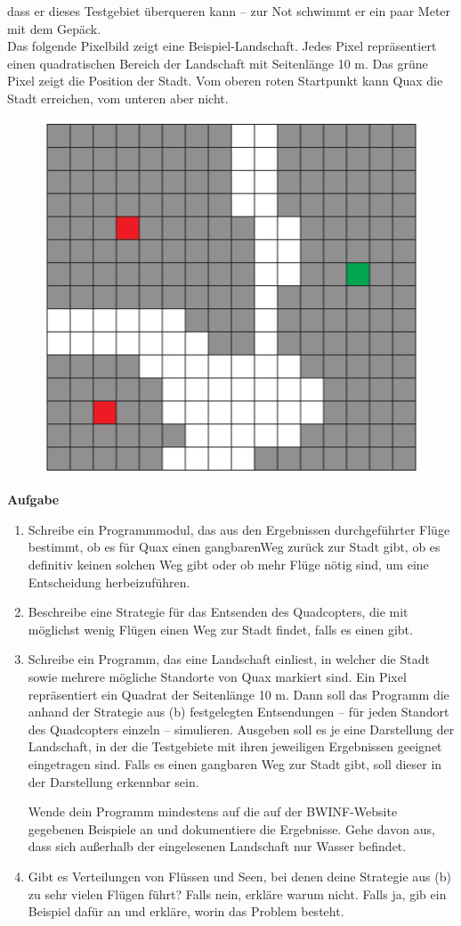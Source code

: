 \documentclass[a4paper,12pt]{article}
\begin{document}
dass er dieses Testgebiet überqueren kann – zur Not schwimmt er ein paar Meter mit dem Gepäck.
\\[0.4cm]
Das folgende Pixelbild zeigt eine Beispiel-Landschaft. Jedes Pixel repräsentiert einen quadratischen
Bereich der Landschaft mit Seitenlänge 10 m. Das grüne Pixel zeigt die Position der
Stadt. Vom oberen roten Startpunkt kann Quax die Stadt erreichen, vom unteren aber nicht.
\begin{figure}[H]
\centering
    \includegraphics[width=0.4\linewidth]{Bilder/Aufgabe3/Aufgabenstellung_01.png}
\end{figure}
\begin{large}
    \textbf{Aufgabe} \\
\end{large}
\vspace{-0.6cm}
\begin{enumerate}[label=(\emph{\alph*})]
\item Schreibe ein Programmmodul, das aus den Ergebnissen durchgeführter Flüge bestimmt,
ob es für Quax einen gangbarenWeg zurück zur Stadt gibt, ob es definitiv keinen solchen
Weg gibt oder ob mehr Flüge nötig sind, um eine Entscheidung herbeizuführen.
\item Beschreibe eine Strategie für das Entsenden des Quadcopters, die mit möglichst wenig
Flügen einen Weg zur Stadt findet, falls es einen gibt.
\item Schreibe ein Programm, das eine Landschaft einliest, in welcher die Stadt sowie mehrere
mögliche Standorte von Quax markiert sind. Ein Pixel repräsentiert ein Quadrat der
Seitenlänge 10 m. Dann soll das Programm die anhand der Strategie aus (b) festgelegten
Entsendungen – für jeden Standort des Quadcopters einzeln – simulieren. Ausgeben soll
es je eine Darstellung der Landschaft, in der die Testgebiete mit ihren jeweiligen Ergebnissen
geeignet eingetragen sind. Falls es einen gangbaren Weg zur Stadt gibt, soll dieser
in der Darstellung erkennbar sein.

Wende dein Programm mindestens auf die auf der BWINF-Website gegebenen Beispiele
an und dokumentiere die Ergebnisse. Gehe davon aus, dass sich außerhalb der eingelesenen
Landschaft nur Wasser befindet.
\item Gibt es Verteilungen von Flüssen und Seen, bei denen deine Strategie aus (b) zu sehr
vielen Flügen führt? Falls nein, erkläre warum nicht. Falls ja, gib ein Beispiel dafür an
und erkläre, worin das Problem besteht.
\end{enumerate}
\end{document}
